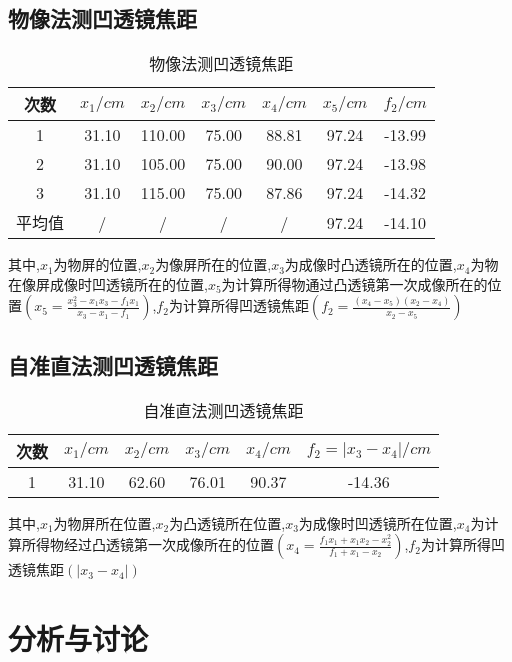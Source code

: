 \documentclass[a4 paper,12pt]{article}
\begin{document}
\subsection{物像法测凹透镜焦距}
\begin{table}[H] 
	\caption{物像法测凹透镜焦距}
	\label{物像法测凹透镜焦距}
	\centering
		\begin{tabular}{ccccccc}
			\toprule[0.5mm]
			次数 & $x_{1}/cm$  & $x_{2}/cm $ & $x_{3}/cm$  & $x_{4}/cm$&$x_{5}/cm$&$f_{2}/cm$  \\
			\midrule
			1 & 31.10  & 110.00  & 75.00  & 88.81&97.24&-13.99  \\
			2 & 31.10  & 105.00  & 75.00  & 90.00&97.24&-13.98  \\
			3 & 31.10  & 115.00  & 75.00 & 87.86 &97.24&-14.32 \\
			平均值&/&/&/&/&97.24&-14.10   \\
			\bottomrule
	\end{tabular}
\end{table}
其中,$x_{1}$为物屏的位置,$x_{2}$为像屏所在的位置,$x_{3}$为成像时凸透镜所在的位置,$x_{4}$为物在像屏成像时凹透镜所在的位置,$x_{5}$为计算所得物通过凸透镜第一次成像所在的位置$(x_{5}=\frac{x_{3}^{2}-x_{1}x_{3}-f_{1}x_{1}}{x_{3}-x_{1}-f_{1}})$,$f_{2}$为计算所得凹透镜焦距$(f_{2}=\frac{(x_{4}-x_{5})(x_{2}-x_{4})}{x_{2}-x_{5}})$

\subsection{自准直法测凹透镜焦距}
\begin{table}[H] 
	\caption{自准直法测凹透镜焦距}
	\label{自准直法测凹透镜焦距}
	\centering
		\begin{tabular}{cccccc}
			\toprule
			次数 & $x_{1}/cm$ & $x_{2}/cm$ & $x_{3}/cm$&$x_{4}/cm$&$f_{2}=|x_{3}-x_{4}|/cm$ \\
			\midrule
			1 & 31.10 & 62.60 & 76.01&90.37&-14.36 \\
			\bottomrule[0.5mm]
	\end{tabular}
\end{table}
其中,$x_{1}$为物屏所在位置,$x_{2}$为凸透镜所在位置,$x_{3}$为成像时凹透镜所在位置,$x_{4}$为计算所得物经过凸透镜第一次成像所在的位置$(x_{4}=\frac{f_{1}x_{1}+x_{1}x_{2}-x_{2}^{2}}{f_{1}+x_{1}-x_{2}})$,$f_{2}$为计算所得凹透镜焦距$(|x_{3}-x_{4}|)$

\section{分析与讨论}
\end{document}
